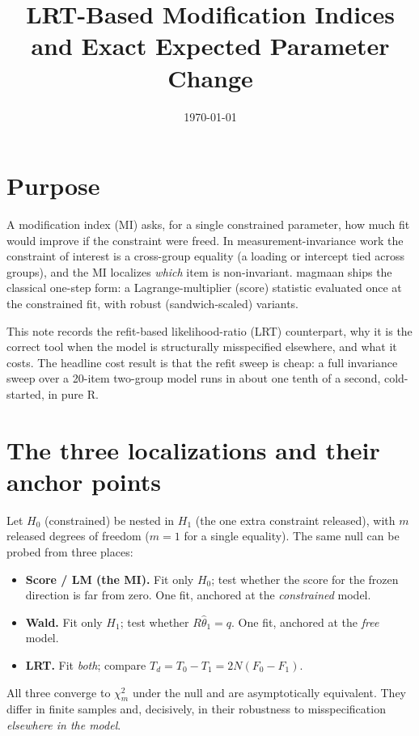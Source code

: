 \documentclass[11pt]{article}
\title{LRT-Based Modification Indices and Exact Expected Parameter Change}
\author{}
\date{\today}
\newcommand{\Th}{\hat\theta}
\theoremstyle{plain}
\theoremstyle{remark}
\begin{document}
\maketitle

\section*{Purpose}

A modification index (MI) asks, for a single constrained parameter, how much fit
would improve if the constraint were freed. In measurement-invariance work the
constraint of interest is a cross-group equality (a loading or intercept tied
across groups), and the MI localizes \emph{which} item is non-invariant. magmaan
ships the classical one-step form: a Lagrange-multiplier (score) statistic
evaluated once at the constrained fit, with robust (sandwich-scaled) variants.

This note records the refit-based likelihood-ratio (LRT) counterpart, why it is
the correct tool when the model is structurally misspecified elsewhere, and what
it costs. The headline cost result is that the refit sweep is cheap: a full
invariance sweep over a 20-item two-group model runs in about one tenth of a
second, cold-started, in pure R.

\section{The three localizations and their anchor points}

Let $H_0$ (constrained) be nested in $H_1$ (the one extra constraint released),
with $m$ released degrees of freedom ($m=1$ for a single equality). The same
null can be probed from three places:
\begin{itemize}
\item \textbf{Score / LM (the MI).} Fit only $H_0$; test whether the score for
  the frozen direction is far from zero. One fit, anchored at the
  \emph{constrained} model.
\item \textbf{Wald.} Fit only $H_1$; test whether $R\Th_1 = q$. One fit, anchored
  at the \emph{free} model.
\item \textbf{LRT.} Fit \emph{both}; compare $T_d = T_0 - T_1 = 2N(F_0 - F_1)$.
\end{itemize}
All three converge to $\chi^2_m$ under the null and are asymptotically
equivalent. They differ in finite samples and, decisively, in their robustness
to misspecification \emph{elsewhere in the model}.
\end{document}
